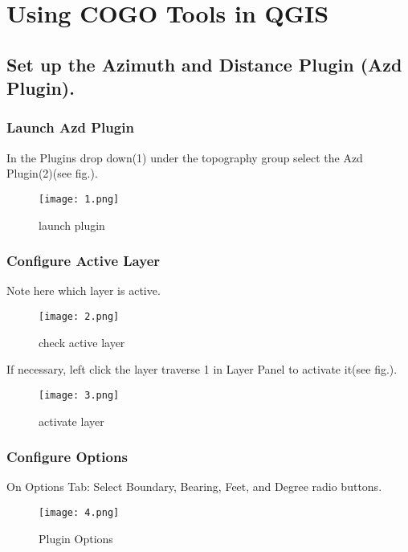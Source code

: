 \documentclass{book}
\begin{document}
\section{Using COGO Tools in QGIS}

\subsection{Set up the Azimuth and Distance Plugin \small(Azd Plugin).}

\subsubsection{Launch Azd Plugin}
\large {In the Plugins drop down(1) under the topography group select the Azd Plugin(2)(see fig.).}
\begin{figure}[H] %
\begin{center}
	\texttt{[image: 1.png]}
	\end{center}
	\caption{launch plugin}	
\end{figure}
\clearpage

\subsubsection{Configure Active Layer}
\large Note here which layer is active.
\begin{figure}[H] %
\begin{center}
	\texttt{[image: 2.png]} 
	\end{center}
	\caption{check active layer}
\end{figure}

If necessary, left click the layer traverse 1 in Layer Panel to activate it(see fig.).
\begin{figure}[H] %
\begin{center}
	\texttt{[image: 3.png]} 
	\end{center}
	\caption{activate layer}
\end{figure}

\subsubsection{Configure Options}
\large On Options Tab: Select Boundary, Bearing, Feet, and Degree radio buttons.
\begin{figure}[H]
\begin{center}
	\texttt{[image: 4.png]} 
	\end{center}
	\caption{Plugin Options}
\end{figure}
\pagebreak
\end{document}
